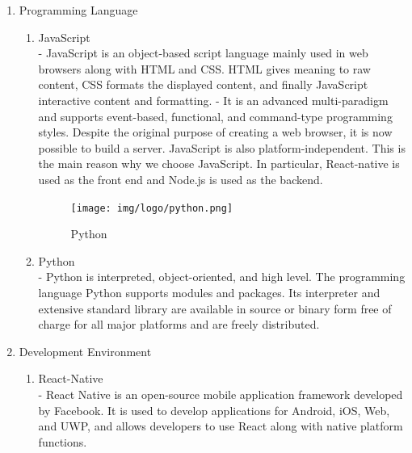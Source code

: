 \documentclass[conference]{IEEEtran}
\begin{document}
\begin{enumerate}
\begin{itemize}
        
    \end{itemize}
    \item Programming Language\\
    \begin{enumerate}
        \begin{figure}[h!]
            \centerline{\texttt{[image: img/logo/javascript.png]}}
            \caption{JavaScript}
        \end{figure}
        \item JavaScript\\  
        - JavaScript is an object-based script language mainly used in web browsers along with HTML and CSS. HTML gives meaning to raw content, CSS formats the displayed content, and finally JavaScript interactive content and formatting.
        - It is an advanced multi-paradigm and supports event-based, functional, and command-type programming styles. Despite the original purpose of creating a web browser, it is now possible to build a server. JavaScript is also platform-independent. This is the main reason why we choose JavaScript. In particular, React-native is used as the front end and Node.js is used as the backend.
        \begin{figure}[h!]
        \centerline{\texttt{[image: img/logo/python.png]}}
        \caption{Python}
        \end{figure}
        \item Python\\
        - Python is interpreted, object-oriented, and high level. The programming language Python supports modules and packages. Its interpreter and extensive standard library are available in source or binary form free of charge for all major platforms and are freely distributed.
    \end{enumerate}
    \item Development Environment
    \begin{enumerate}
        \begin{figure}[h!]
            \centerline{\texttt{[image: img/logo/reactnative.png]}}
            \caption{ReactNative}
        \end{figure}
        \item React-Native\\
        - React Native is an open-source mobile application framework developed by Facebook. It is used to develop applications for Android, iOS, Web, and UWP, and allows developers to use React along with native platform functions.
         \begin{figure}[h!]

\end{figure}
\end{enumerate}
\end{enumerate}
\end{document}
